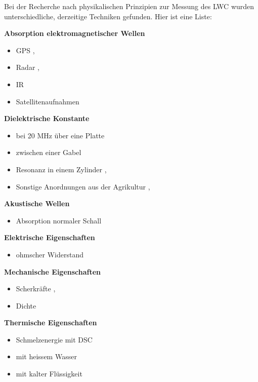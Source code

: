 Bei der Recherche nach physikalischen Prinzipien zur Messung des LWC wurden unterschiedliche, derzeitige Techniken gefunden. Hier ist eine Liste:

\textbf{Absorption elektromagnetischer Wellen}
\begin{itemize}
\item GPS \cite{Koch.2019}, \cite{Koch.2014}
\item Radar \cite{Bonnell.2021}, \cite{ilmsens-short-range-radar}
\item IR \cite{Donahue.2022}
\item Satellitenaufnahmen \cite{Tsang.2022}

\end{itemize}

\textbf{Dielektrische Konstante}
\begin{itemize}
\item bei 20 MHz über eine Platte \cite{slf}
\item zwischen einer Gabel \cite{fork}
\item Resonanz in einem Zylinder \cite{a2photonicsensors}, \cite{nasa-snowex-2020}
\item Sonstige Anordnungen aus der Agrikultur \cite{Mavrovic.2020}, \cite{PerezDiaz.2017}
\end{itemize}

\textbf{Akustische Wellen}
\begin{itemize}
\item Absorption normaler Schall \cite{Kinar.2007}
\end{itemize}


\textbf{Elektrische Eigenschaften}
\begin{itemize}
\item ohmscher Widerstand \cite{Abdelaal.2022}
\end{itemize}

\textbf{Mechanische Eigenschaften}
\begin{itemize}
\item Scherkräfte \cite{Hao.2021}, \cite{jstage-snow-density}
\item Dichte \cite{nasa-snow-density}

\end{itemize}

\textbf{Thermische Eigenschaften}
\begin{itemize}
\item Schmelzenergie mit DSC \cite{mt-density-meter}
\item mit heissem Wasser \cite{Fasani.2023}
\item mit kalter Flüssigkeit

\end{itemize}

